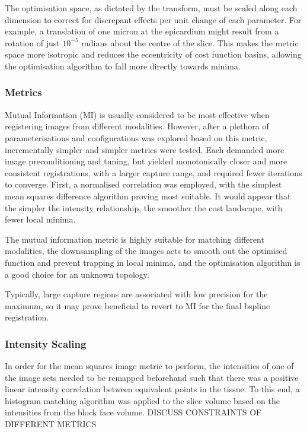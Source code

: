       The optimisation space, as dictated by the transform, must be scaled along each dimension to correct for discrepant effects per unit change of each parameter. For example, a translation of one micron at the epicardium might result from a rotation of just $10^{-5}$ radians about the centre of the slice. This makes the metric space more isotropic and reduces the eccentricity of cost function basins, allowing the optimisation algorithm to fall more directly towards minima.
    
    \subsubsection{Metrics} %
    \label{ssub:metrics}
      Mutual Information (MI) is usually considered to be most effective when registering images from different modalities. However, after a plethora of parameterisations and configurations was explored based on this metric, incrementally simpler and simpler metrics were tested. Each demanded more image preconditioning and tuning, but yielded monotonically closer and more consistent registrations, with a larger capture range, and required fewer iterations to converge. First, a normalised correlation was employed, with the simplest mean squares difference algorithm proving most suitable. It would appear that the simpler the intensity relationship, the smoother the cost landscape, with fewer local minima.
      
      The mutual information metric is highly suitable for matching different modalities, the downsampling of the images acts to smooth out the optimised function and prevent trapping in local minima, and the optimisation algorithm is a good choice for an unknown topology. 
      
      
      Typically, large capture regions are associated with low precision for the maximum, so it may prove beneficial to revert to MI for the final bspline registration.
    
    \subsubsection{Intensity Scaling} %
    \label{ssub:intensity_scaling}
      In order for the mean squares image metric to perform, the intensities of one of the image sets needed to be remapped beforehand such that there was a positive linear intensity correlation between equivalent points in the tissue. To this end, a histogram matching algorithm was applied to the slice volume based on the intensities from the block face volume. DISCUSS CONSTRAINTS OF DIFFERENT METRICS
    
